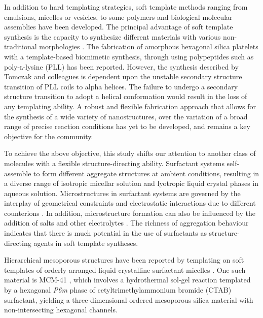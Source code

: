 \documentclass[a4paper,12pt,twocolumn]{article}
\begin{document}
In addition to hard templating strategies, soft template methods ranging from emulsions, micelles or vesicles, to some polymers and biological molecular assemblies have been developed. The principal advantage of soft template synthesis is the capacity to synthesize different materials with various non-traditional morphologies \cite{wan2007}. The fabrication of amorphous hexagonal silica platelets with a template-based biomimetic synthesis, through using polypeptides such as poly-\textsc{l}-lysine (PLL) \cite{tomczak2005,bellomo2006} has been reported. However, the synthesis described by Tomczak and colleagues is dependent upon the unstable secondary structure transition of PLL coils to alpha helices. The failure to undergo a secondary structure transition to adopt a helical conformation would result in the loss of any templating ability. A robust and flexible fabrication approach that allows for the synthesis of a wide variety of nanostructures, over the variation of a broad range of precise reaction conditions has yet to be developed, and remains a key objective for the community.

To achieve the above objective, this study shifts our attention to another class of molecules with a flexible structure-directing ability. Surfactant systems self-assemble to form different aggregate structures at ambient conditions, resulting in a diverse range of isotropic micellar solution and lyotropic liquid crystal phases in aqueous solution. Microstructures in surfactant systems are governed by the interplay of geometrical constraints \cite{israelachvili1976} and electrostatic interactions due to different counterions \cite{kang1993}. In addition, microstructure formation can also be influenced by the addition of salts and other electrolytes \cite{thalberg1991}. The richness of aggregation behaviour indicates that there is much potential in the use of surfactants as structure-directing agents in soft template syntheses. 

Hierarchical mesoporous structures have been reported by templating on soft templates of orderly arranged liquid crystalline surfactant micelles \cite{colfen2007}. One such material is MCM-41 \cite{kresge1992}, which involves a hydrothermal sol-gel reaction templated by a hexagonal \textit{P6m} phase of cetyltrimethylammonium bromide (CTAB) surfactant, yielding a three-dimensional ordered mesoporous silica material with non-intersecting hexagonal channels. 
\end{document}
